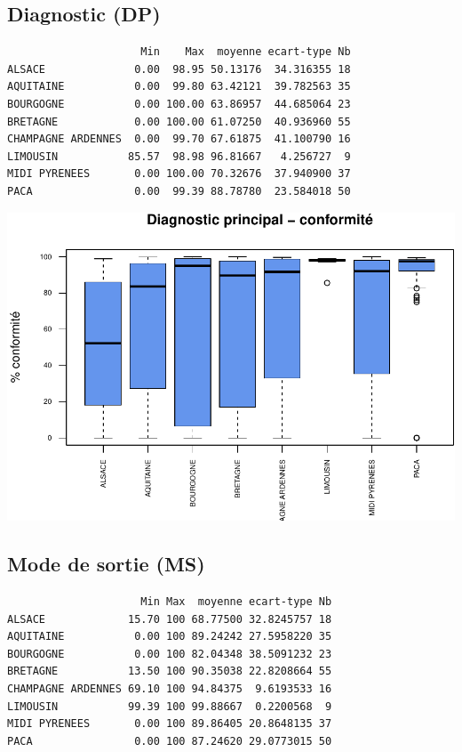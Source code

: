 \documentclass[]{article}
\begin{document}
\subsection{Diagnostic (DP)}\label{diagnostic-dp-1}

\begin{verbatim}
                     Min    Max  moyenne ecart-type Nb
ALSACE              0.00  98.95 50.13176  34.316355 18
AQUITAINE           0.00  99.80 63.42121  39.782563 35
BOURGOGNE           0.00 100.00 63.86957  44.685064 23
BRETAGNE            0.00 100.00 61.07250  40.936960 55
CHAMPAGNE ARDENNES  0.00  99.70 67.61875  41.100790 16
LIMOUSIN           85.57  98.98 96.81667   4.256727  9
MIDI PYRENEES       0.00 100.00 70.32676  37.940900 37
PACA                0.00  99.39 88.78780  23.584018 50
\end{verbatim}

\includegraphics{septembre2015_files/figure-latex/unnamed-chunk-26-1.pdf}

\subsection{Mode de sortie (MS)}\label{mode-de-sortie-ms-1}

\begin{verbatim}
                     Min Max  moyenne ecart-type Nb
ALSACE             15.70 100 68.77500 32.8245757 18
AQUITAINE           0.00 100 89.24242 27.5958220 35
BOURGOGNE           0.00 100 82.04348 38.5091232 23
BRETAGNE           13.50 100 90.35038 22.8208664 55
CHAMPAGNE ARDENNES 69.10 100 94.84375  9.6193533 16
LIMOUSIN           99.39 100 99.88667  0.2200568  9
MIDI PYRENEES       0.00 100 89.86405 20.8648135 37
PACA                0.00 100 87.24620 29.0773015 50
\end{verbatim}
\end{document}
